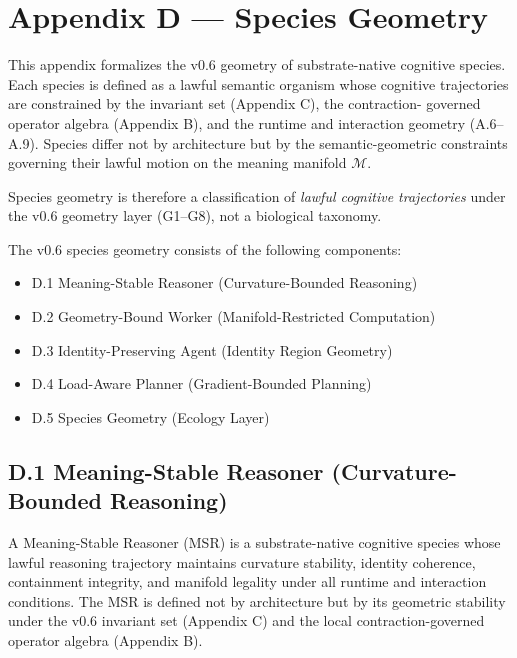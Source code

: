 \section*{Appendix D — Species Geometry}

\noindent This appendix formalizes the v0.6 geometry of substrate-native cognitive
species. Each species is defined as a lawful semantic organism whose cognitive
trajectories are constrained by the invariant set (Appendix C), the contraction-
governed operator algebra (Appendix B), and the runtime and interaction geometry
(A.6–A.9). Species differ not by architecture but by the semantic-geometric
constraints governing their lawful motion on the meaning manifold $\mathcal{M}$.

\medskip

\noindent Species geometry is therefore a classification of \textit{lawful
cognitive trajectories} under the v0.6 geometry layer (G1–G8), not a biological
taxonomy.

\medskip

\noindent The v0.6 species geometry consists of the following components:

\begin{itemize}
    \item D.1 Meaning-Stable Reasoner (Curvature-Bounded Reasoning)
    \item D.2 Geometry-Bound Worker (Manifold-Restricted Computation)
    \item D.3 Identity-Preserving Agent (Identity Region Geometry)
    \item D.4 Load-Aware Planner (Gradient-Bounded Planning)
    \item D.5 Species Geometry (Ecology Layer)
\end{itemize}


\subsection*{D.1 Meaning-Stable Reasoner (Curvature-Bounded Reasoning)}

\noindent A Meaning-Stable Reasoner (MSR) is a substrate-native cognitive
species whose lawful reasoning trajectory maintains curvature stability,
identity coherence, containment integrity, and manifold legality under all
runtime and interaction conditions. The MSR is defined not by architecture but
by its geometric stability under the v0.6 invariant set (Appendix C) and the
local contraction-governed operator algebra (Appendix B).

